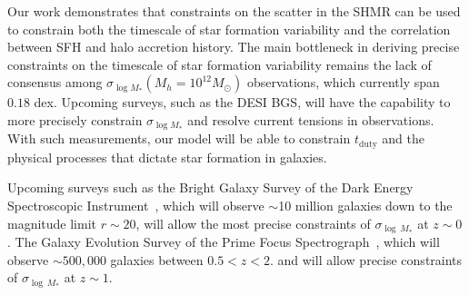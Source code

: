 \documentclass[12pt, letterpaper, preprint, tighten]{aastex62}
\begin{document}
Our work demonstrates that constraints on the scatter in the SHMR can be
used to constrain both the timescale of star formation variability and
the correlation between SFH and halo accretion history. The main
bottleneck in deriving precise constraints on the timescale of star formation
variability remains the lack of consensus among $\sigma_{\log M_*}(M_h=10^{12}M_\odot)$
observations, which currently span $0.18$ dex. Upcoming surveys, such as
the DESI BGS, will have the capability to more precisely constrain
$\sigma_{\log M_*}$ and resolve current tensions in observations. With
such measurements, our model will be able to constrain $t_\mathrm{duty}$
and the physical processes that dictate star formation in galaxies.

Upcoming surveys such as the Bright Galaxy Survey of the Dark
Energy Spectroscopic Instrument~\citep[DESI;][]{desicollaboration2016}, which will
observe $\sim$10 million galaxies down to the magnitude limit $r \sim 20$, will
allow the most precise constraints of $\sigma_{\log\,M_*}$ at $z\sim0$. The Galaxy
Evolution Survey of the Prime Focus Spectrograph~\citep{takada2014,tamura2016}, 
which will observe $\sim500,000$ galaxies between $0.5 < z < 2.$ and will allow
precise constraints of $\sigma_{\log\,M_*}$ at $z\sim1$.


\end{document}
